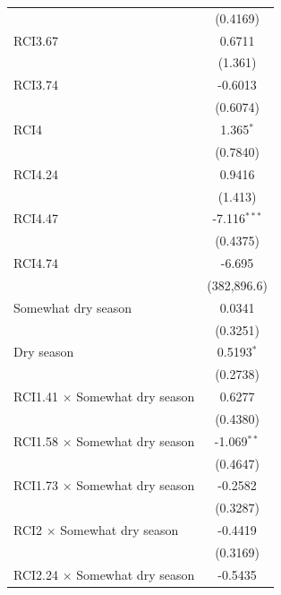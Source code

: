 \begin{table}[H]
\begin{tabular}{lc}
                                            & (0.4169)\\   
      RCI3.67                               & 0.6711\\   
                                            & (1.361)\\   
      RCI3.74                               & -0.6013\\   
                                            & (0.6074)\\   
      RCI4                                  & 1.365$^{*}$\\   
                                            & (0.7840)\\   
      RCI4.24                               & 0.9416\\   
                                            & (1.413)\\   
      RCI4.47                               & -7.116$^{***}$\\   
                                            & (0.4375)\\   
      RCI4.74                               & -6.695\\   
                                            & (382,896.6)\\   
      Somewhat dry season                   & 0.0341\\   
                                            & (0.3251)\\   
      Dry season                            & 0.5193$^{*}$\\   
                                            & (0.2738)\\   
      RCI1.41 $\times$ Somewhat dry season  & 0.6277\\   
                                            & (0.4380)\\   
      RCI1.58 $\times$ Somewhat dry season  & -1.069$^{**}$\\   
                                            & (0.4647)\\   
      RCI1.73 $\times$ Somewhat dry season  & -0.2582\\   
                                            & (0.3287)\\   
      RCI2 $\times$ Somewhat dry season     & -0.4419\\   
                                            & (0.3169)\\   
      RCI2.24 $\times$ Somewhat dry season  & -0.5435\\   

\end{tabular}
\end{table}
